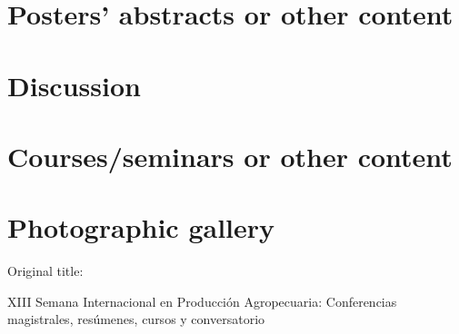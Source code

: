 \documentclass{clase/sipa}
\begin{document}
\newpage



\newpage
{}
\nombsec{}
\part{Posters' abstracts or other content}

\newpage




\newpage
{}
\nombsec{}
\part{Discussion}

\newpage


\newpage
{}
\nombsec{}
\part{Courses/seminars or other content}
\sloppy

\newpage


\newpage
{}
\nombsec{}
\part{Photographic gallery}

\newpage


\newpage
\pagestyle{plain}
\vspace*{.2cm}
\fontsize{10}{11}\selectfont
\setlength{\parindent}{0pt}
Original title:

XIII Semana Internacional en Producción Agropecuaria: Conferencias magistrales, resúmenes, cursos y conversatorio\\
\end{document}
